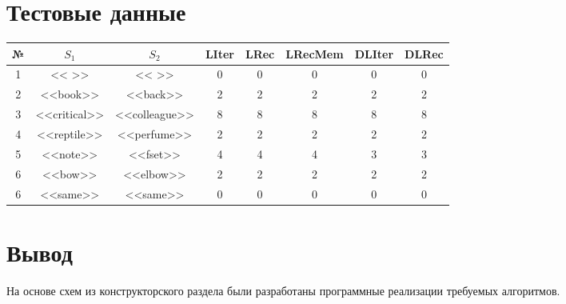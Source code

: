\section{Тестовые данные}

\begin{table}[h!]
	\begin{center}
		
		\begin{tabular}{||c c c | c c c c c||} 
			\hline
			№ & $S_1$ & $S_2$ & LIter & LRec & LRecMem & DLIter & DLRec \\ [0.5ex] 
			\hline\hline
			1 & << >> & << >> & 0 & 0 & 0 & 0 & 0 \\ 
			2 & <<book>> & <<back>> & 2 & 2 & 2 & 2 & 2 \\ 
			3 & <<critical>> & <<colleague>> & 8 & 8 & 8 & 8 & 8 \\ 
			4 & <<reptile>> & <<perfume>> & 2 & 2 & 2 & 2 & 2 \\ 
			5 & <<note>> & <<fset>> & 4 & 4 & 4 & 3 & 3 \\
			6 & <<bow>> & <<elbow>> & 2 & 2 & 2 & 2 & 2 \\   
			6 & <<same>> & <<same>> & 0 & 0 & 0 & 0 & 0 \\   
			\hline
		\end{tabular}
	\end{center}
\end{table}

\section{Вывод}
На основе схем из конструкторского раздела были разработаны программные реализации требуемых алгоритмов.
